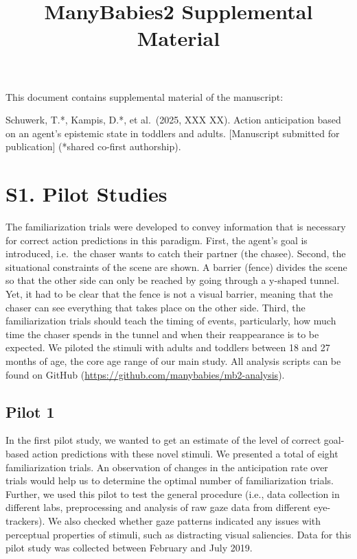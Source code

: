 \documentclass[
  man, donotrepeattitle,floatsintext]{apa6}
\title{ManyBabies2 Supplemental Material}
\author{\phantom{0}}
\date{}
\affiliation{\phantom{0}}
\begin{document}
\maketitle

\setcounter{table}{0}  \renewcommand{\thetable}{S\arabic{table}} \setcounter{figure}{0} \renewcommand{\thefigure}{S\arabic{figure}}

This document contains supplemental material of the manuscript:

Schuwerk, T.*, Kampis, D.*, et al.~(2025, XXX XX). Action anticipation based on an agent's epistemic state in toddlers and adults. {[}Manuscript submitted for publication{]} (*shared co-first authorship).

\section{S1. Pilot Studies}\label{s1.-pilot-studies}

The familiarization trials were developed to convey information that is necessary for correct action predictions in this paradigm. First, the agent's goal is introduced, i.e.~the chaser wants to catch their partner (the chasee). Second, the situational constraints of the scene are shown. A barrier (fence) divides the scene so that the other side can only be reached by going through a y-shaped tunnel. Yet, it had to be clear that the fence is not a visual barrier, meaning that the chaser can see everything that takes place on the other side. Third, the familiarization trials should teach the timing of events, particularly, how much time the chaser spends in the tunnel and when their reappearance is to be expected. We piloted the stimuli with adults and toddlers between 18 and 27 months of age, the core age range of our main study. All analysis scripts can be found on GitHub (\url{https://github.com/manybabies/mb2-analysis}).

\subsection{Pilot 1}\label{pilot-1}

In the first pilot study, we wanted to get an estimate of the level of correct goal-based action predictions with these novel stimuli. We presented a total of eight familiarization trials. An observation of changes in the anticipation rate over trials would help us to determine the optimal number of familiarization trials. Further, we used this pilot to test the general procedure (i.e., data collection in different labs, preprocessing and analysis of raw gaze data from different eye-trackers). We also checked whether gaze patterns indicated any issues with perceptual properties of stimuli, such as distracting visual saliencies. Data for this pilot study was collected between February and July 2019.
\end{document}
